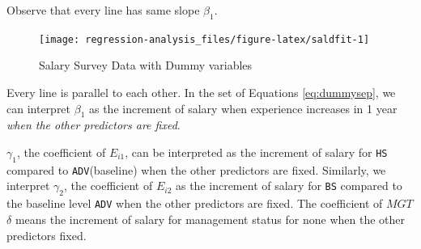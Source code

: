 \documentclass[]{book}
\newenvironment{Shaded}{\begin{snugshade}}{\end{snugshade}}
\newcommand{\DataTypeTok}[1]{\textcolor[rgb]{0.13,0.29,0.53}{#1}}
\newcommand{\FloatTok}[1]{\textcolor[rgb]{0.00,0.00,0.81}{#1}}
\newcommand{\KeywordTok}[1]{\textcolor[rgb]{0.13,0.29,0.53}{\textbf{#1}}}
\newcommand{\NormalTok}[1]{#1}
\newcommand{\OperatorTok}[1]{\textcolor[rgb]{0.81,0.36,0.00}{\textbf{#1}}}
\newcommand{\OtherTok}[1]{\textcolor[rgb]{0.56,0.35,0.01}{#1}}
\newcommand{\StringTok}[1]{\textcolor[rgb]{0.31,0.60,0.02}{#1}}
\theoremstyle{definition}
\theoremstyle{definition}
\theoremstyle{definition}
\theoremstyle{remark}
\begin{document}
Observe that every line has same slope \(\beta_1\).

\begin{Shaded}
\end{Shaded}

\begin{figure}[H]

{\centering \texttt{[image: regression-analysis\_files/figure-latex/saldfit-1]} 

}

\caption{Salary Survey Data with Dummy variables}\label{fig:saldfit}
\end{figure}

Every line is parallel to each other. In the set of Equations \eqref{eq:dummysep}, we can interpret \(\beta_1\) as the increment of salary when experience increases in 1 year \emph{when the other predictors are fixed}.

\(\gamma_1\), the coefficient of \(E_{i1}\), can be interpreted as the increment of salary for \texttt{HS} compared to \texttt{ADV}(baseline) when the other predictors are fixed. Similarly, we interpret \(\gamma_2\), the coefficient of \(E_{i2}\) as the increment of salary for \texttt{BS} compared to the baseline level \texttt{ADV} when the other predictors are fixed. The coefficient of \(MGT\) \(\delta\) means the increment of salary for management status for none when the other predictors fixed.
\end{document}
